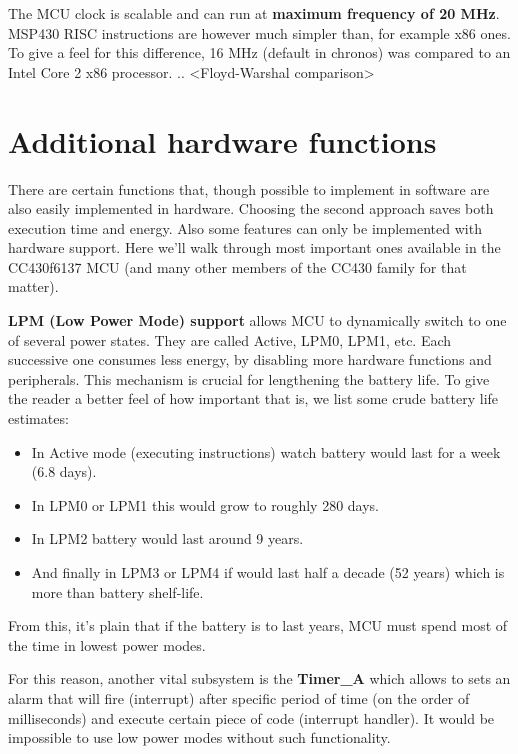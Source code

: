 The MCU clock is scalable and can run at {\bf maximum frequency of 20 MHz}.
MSP430 RISC instructions are however much simpler than, for example
x86 ones. To give a feel for this difference, 16 MHz (default in
chronos) was compared to an Intel Core 2 x86 processor. ..
<Floyd-Warshal comparison> %

\section{Additional hardware functions}

There are certain functions that, though possible to implement in
software are also easily implemented in hardware. Choosing the second
approach saves both execution time and energy.  Also some features can
only be implemented with hardware support.  Here we'll walk through
most important ones available in the CC430f6137 MCU (and many other
members of the CC430 family for that matter).

{\bf LPM (Low Power Mode) support} allows MCU to dynamically switch to
one of several power states.  They are called Active, LPM0, LPM1, etc.
Each successive one consumes less energy, by disabling more hardware
functions and peripherals. This mechanism is crucial for lengthening
the battery life. To give the reader a better feel of how important
that is, we list some crude battery life estimates:

\begin{itemize}
    \item In Active mode (executing instructions) watch battery would
    last for a week (6.8 days).
    \item In LPM0 or LPM1 this would grow to roughly 280 days.
    \item In LPM2 battery would last around 9 years.
    \item And finally in LPM3 or LPM4 if would last half a decade (52
    years) which is more than battery shelf-life.
\end{itemize}
From this, it's plain that if the battery is to last years, MCU must
spend most of the time in lowest power modes.

For this reason, another vital subsystem is the {\bf Timer\_A} which
allows to sets an alarm that will fire (interrupt) after specific
period of time (on the order of milliseconds) and execute certain
piece of code (interrupt handler). It would be impossible to use low
power modes without such functionality.

